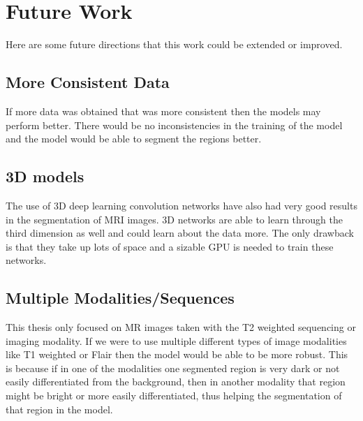 \section{Future Work}
    Here are some future directions that this work could be extended or improved.
    
\subsection{More Consistent Data}
    If more data was obtained that was more consistent then the models may perform better.
    There would be no inconsistencies in the training of the model and the model would be able to segment the regions better.
    
\subsection{3D models}
    The use of 3D deep learning convolution networks have also had very good results in the segmentation of MRI images. 
    3D networks are able to learn through the third dimension as well and could learn about the data more.
    The only drawback is that they take up lots of space and a sizable GPU is needed to train these networks.
    
\subsection{Multiple Modalities/Sequences}
    This thesis only focused on MR images taken with the T2 weighted sequencing or imaging modality.
    If we were to use multiple different types of image modalities like T1 weighted or Flair then the model would be able to be more robust.
    This is because if in one of the modalities one segmented region is very dark or not easily differentiated from the background, then in another modality that region might be bright or more easily differentiated, thus helping the segmentation of that region in the model.